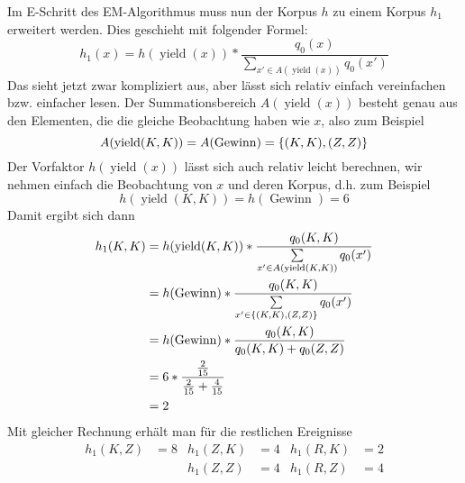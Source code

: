 \documentclass[ngerman, a4paper, 12pt]{article}
\DeclareMathOperator{\yield}{yield}
\DeclareMathOperator{\win}{Gewinn}
\begin{document}
\begin{enumerate}[label=\textbf{(\alph*)}, leftmargin=0pt]
	Im E-Schritt des EM-Algorithmus muss nun der Korpus $h$ zu einem Korpus $h_1$ erweitert werden. Dies geschieht mit folgender Formel:
	\begin{equation*}
		h_1(x) = h(\yield(x)) * \frac{q_0(x)}{\sum\limits_{x' \in A(\yield(x))} q_0(x')}
	\end{equation*}
	Das sieht jetzt zwar kompliziert aus, aber lässt sich relativ einfach vereinfachen bzw. einfacher lesen. Der Summationsbereich $A(\yield(x))$ besteht genau aus den Elementen, die die gleiche Beobachtung haben wie $x$, also zum Beispiel
	\begin{equation*}
		A(\yield(K,K)) = A(\win) = \menge{(K,K), (Z,Z)}
	\end{equation*}
	Der Vorfaktor $h(\yield(x))$ lässt sich auch relativ leicht berechnen, wir nehmen einfach die Beobachtung von $x$ und deren Korpus, d.h. zum Beispiel
	\begin{equation*}
		h(\yield(K,K)) = h(\win) = 6
	\end{equation*}
	Damit ergibt sich dann
	\begin{align*}
		h_1(K,K) &= h(\yield(K,K)) * \frac{q_0(K,K)}{\sum\limits_{x' \in A(\yield(K,K))} q_0(x')} \\
		&= h(\win) * \frac{q_0(K,K)}{\sum\limits_{x' \in \menge{(K,K),(Z,Z)}} q_0(x')} \\
		&= h(\win) * \frac{q_0(K,K)}{q_0(K,K) + q_0(Z,Z)} \\
		&= 6 * \frac{\frac{2}{15}}{\frac{2}{15} + \frac{4}{15}} \\
		&= 2
	\end{align*}
	Mit gleicher Rechnung erhält man für die restlichen Ereignisse
	\begin{align*}
		h_1(K,Z) &= 8 & h_1(Z,K) &= 4 & h_1(R,K) &= 2 \\
				 &    & h_1(Z,Z) &= 4 & h_1(R,Z) &= 4
	\end{align*}
	


\end{enumerate}
\end{document}
